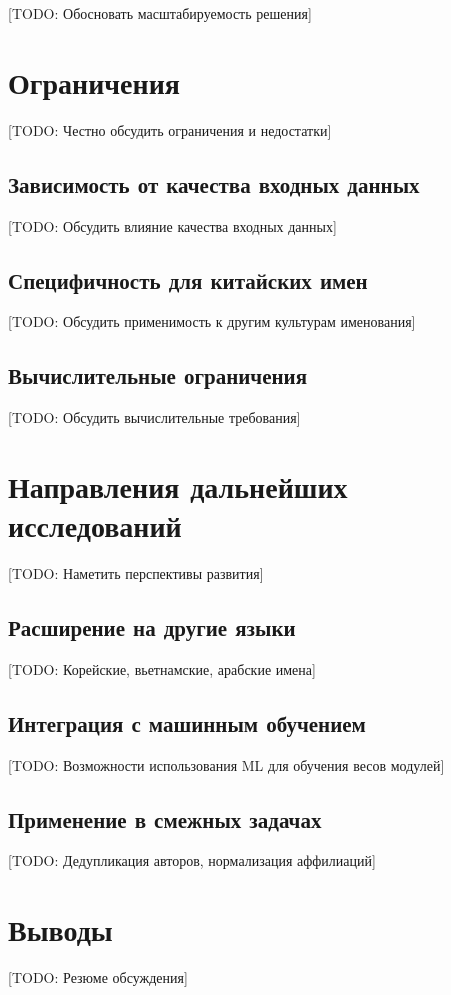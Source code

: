 [TODO: Обосновать масштабируемость решения]

\section{Ограничения}
\label{sec:disc:limitations}

[TODO: Честно обсудить ограничения и недостатки]

\subsection{Зависимость от качества входных данных}
\label{subsec:disc:data_quality}

[TODO: Обсудить влияние качества входных данных]

\subsection{Специфичность для китайских имен}
\label{subsec:disc:specificity}

[TODO: Обсудить применимость к другим культурам именования]

\subsection{Вычислительные ограничения}
\label{subsec:disc:computational}

[TODO: Обсудить вычислительные требования]

\section{Направления дальнейших исследований}
\label{sec:disc:future}

[TODO: Наметить перспективы развития]

\subsection{Расширение на другие языки}
\label{subsec:disc:multilingual}

[TODO: Корейские, вьетнамские, арабские имена]

\subsection{Интеграция с машинным обучением}
\label{subsec:disc:ml_integration}

[TODO: Возможности использования ML для обучения весов модулей]

\subsection{Применение в смежных задачах}
\label{subsec:disc:applications}

[TODO: Дедупликация авторов, нормализация аффилиаций]

\section{Выводы}
\label{sec:disc:conclusions}

[TODO: Резюме обсуждения]
